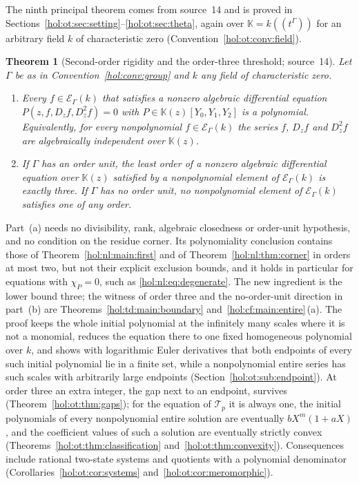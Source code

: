 \documentclass[11pt]{article}
\numberwithin{equation}{section}
\newtheorem{maintheorem}{Theorem}
\theoremstyle{definition}
\theoremstyle{remark}
\newcommand{\KK}{\mathbb K}
\newcommand{\EK}{\mathcal E_\Gamma(k)}
\begin{document}
The ninth principal theorem comes from source~14 and is proved in
Sections~\ref{hol:ot:sec:setting}--\ref{hol:ot:sec:theta}, again over
$\KK=k((t^\Gamma))$ for an arbitrary field $k$ of characteristic zero
(Convention~\ref{hol:ot:conv:field}).

\begin{maintheorem}[Second-order rigidity and the order-three threshold;
source~14]\label{hol:ot:main:second}
Let $\Gamma$ be as in Convention~\ref{hol:conv:group} and $k$ any field of
characteristic zero.
\begin{enumerate}[label=\textup{(\alph*)}]
\item Every $f\in\EK$ that satisfies a nonzero algebraic differential equation
$P(z,f,D_zf,D_z^2f)=0$ with $P\in\KK(z)[Y_0,Y_1,Y_2]$ is a polynomial.
Equivalently, for every nonpolynomial $f\in\EK$ the series $f$, $D_zf$ and
$D_z^2f$ are algebraically independent over $\KK(z)$.
\item If $\Gamma$ has an order unit, the least order of a nonzero algebraic
differential equation over $\KK(z)$ satisfied by a nonpolynomial element of
$\EK$ is exactly three. If $\Gamma$ has no order unit, no nonpolynomial
element of $\EK$ satisfies one of any order.
\end{enumerate}
\end{maintheorem}

Part~(a) needs no divisibility, rank, algebraic closedness or order-unit
hypothesis, and no condition on the residue corner. Its polynomiality
conclusion contains those of Theorem~\ref{hol:nl:main:first} and of
Theorem~\ref{hol:nl:thm:corner} in orders at most two, but not their explicit
exclusion bounds, and it holds in particular for equations with $\chi_P=0$,
such as \eqref{hol:nl:eq:degenerate}. The new ingredient is the
lower bound three; the witness of order three and the no-order-unit direction
in part~(b) are Theorems~\ref{hol:td:main:boundary}
and~\ref{hol:cf:main:entire}\,(a). The proof keeps the whole initial
polynomial at the infinitely many scales where it is not a monomial, reduces
the equation there to one fixed homogeneous polynomial over $k$, and shows
with logarithmic Euler derivatives that both endpoints of every such initial
polynomial lie in a finite set, while a nonpolynomial entire series has such
scales with arbitrarily large endpoints (Section~\ref{hol:ot:sub:endpoint}).
At order three an extra integer, the gap next to an endpoint, survives
(Theorem~\ref{hol:ot:thm:gaps}); for the equation of $\mathcal T_p$ it is
always one, the initial polynomials of every nonpolynomial entire solution
are eventually $bX^m(1+aX)$, and the coefficient values of such a solution
are eventually strictly convex (Theorems~\ref{hol:ot:thm:classification}
and~\ref{hol:ot:thm:convexity}). Consequences include rational two-state
systems and quotients with a polynomial denominator
(Corollaries~\ref{hol:ot:cor:systems} and~\ref{hol:ot:cor:meromorphic}).
\end{document}
